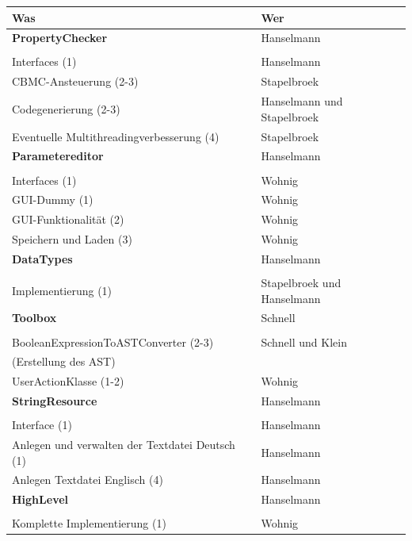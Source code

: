 \documentclass[a4paper]{scrreprt}
\begin{document}
\begin{tabular}{ | p{7cm} | p{7cm} |}
	\hline
	Was & Wer\\
	\hline
	
	\rule{0pt}{15pt}\textbf {PropertyChecker} & Hanselmann\\
	&\\
	\hline
	Interfaces (1) & Hanselmann\\
	\hline
	CBMC-Ansteuerung (2-3) & Stapelbroek \\
	\hline
	Codegenerierung (2-3) & Hanselmann und Stapelbroek \\
	\hline
	Eventuelle Multithreadingverbesserung (4) & Stapelbroek \\
	\hline
	
	\rule{0pt}{15pt}\textbf {Parametereditor} & Hanselmann \\
	&\\
	\hline
	Interfaces (1) & Wohnig\\
	\hline
	GUI-Dummy (1) & Wohnig\\
	\hline
	GUI-Funktionalität (2) & Wohnig\\
	\hline
	Speichern und Laden (3) & Wohnig\\
	\hline
	
	\rule{0pt}{15pt}\textbf {DataTypes} & Hanselmann\\
	&\\
	\hline
	Implementierung (1) & Stapelbroek und Hanselmann\\
	\hline	
	
	\rule{0pt}{15pt}\textbf {Toolbox} & Schnell\\
	&\\
	\hline	
	BooleanExpressionToASTConverter (2-3)  & Schnell und Klein\\
	(Erstellung des AST) &\\
	\hline
	UserActionKlasse (1-2) & Wohnig\\
	\hline
	
	\rule{0pt}{15pt}\textbf {StringResource} & Hanselmann\\
	&\\
	\hline	
	Interface (1) & Hanselmann \\
	\hline
	Anlegen und verwalten der Textdatei Deutsch (1) & Hanselmann \\
	\hline
	Anlegen Textdatei Englisch (4) & Hanselmann \\
	\hline
	
	
	
	\rule{0pt}{15pt}\textbf {HighLevel} & Hanselmann\\
	&\\
	\hline
	Komplette Implementierung (1) & Wohnig\\
	\hline
	

\end{tabular}
\end{document}
